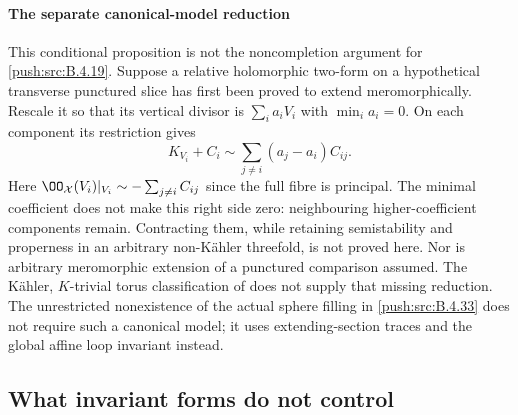 \paragraph{The separate canonical-model reduction}
This conditional proposition is not the noncompletion
argument for \ref{push:src:B.4.19}. Suppose a relative holomorphic two-form
on a hypothetical transverse punctured slice has first
been proved to extend meromorphically. Rescale it so
that its vertical divisor is $\sum_i a_iV_i$ with
$\min_i a_i=0$. On each component its restriction gives
\[
 K_{V_i}+C_i\sim\sum_{j\ne i}(a_j-a_i)C_{ij}.          \tag{B.4.28.11}
\]
Here $\OO_{\mathcal X}(V_i)|_{V_i}\sim
-\sum_{j\ne i}C_{ij}$ since the full fibre is principal.
The minimal coefficient does not make this right side
zero: neighbouring higher-coefficient components remain.
Contracting them, while retaining semistability and
properness in an arbitrary non-K\"ahler threefold, is
not proved here. Nor is arbitrary meromorphic extension
of a punctured comparison assumed. The K\"ahler,
$K$-trivial torus classification of
\citet[Theorem 3.1]{KamenovaToriRoot} does not supply
that missing reduction. The unrestricted nonexistence
of the actual sphere filling in \ref{push:src:B.4.33} does not require
such a canonical model; it uses extending-section traces
and the global affine loop invariant instead.





\subsection{What invariant forms do not control}

